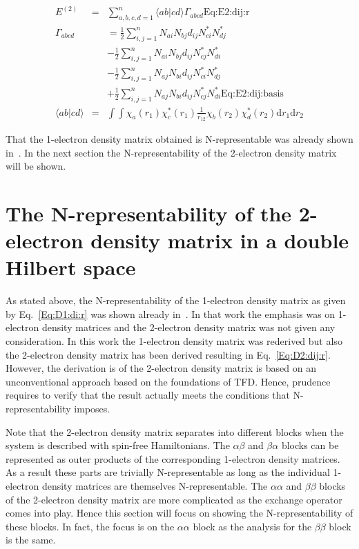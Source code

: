 \documentclass[pra,nofootinbib]{revtex4-1}
\newcommand{\dlabel}[1]{\text{#1}\label{#1}}
\begin{document}
\begin{eqnarray}
  E^{(2)}
  &=& \sum_{a,b,c,d=1}^{n} \langle a b | c d \rangle \Gamma_{abcd} \dlabel{Eq:E2:dij:r} \\
  \Gamma_{abcd}
  &&= \frac{1}{2}\sum_{i,j=1}^{n} N_{ai}N_{bj} d_{ij} N_{ci}^*N_{dj}^* \nonumber \\
  &&- \frac{1}{2}\sum_{i,j=1}^{n} N_{ai}N_{bj} d_{ij} N_{cj}^*N_{di}^* \nonumber \\
  &&- \frac{1}{2}\sum_{i,j=1}^{n} N_{aj}N_{bi} d_{ij} N_{ci}^*N_{dj}^* \nonumber \\
  &&+ \frac{1}{2}\sum_{i,j=1}^{n} N_{aj}N_{bi} d_{ij} N_{cj}^*N_{di}^* \dlabel{Eq:E2:dij:basis} \\
  \langle a b | c d \rangle
  &=& \int\int \chi_a(r_1) \chi^*_c(r_1) \frac{1}{r_{12}} \chi_b(r_2) \chi^*_d(r_2) 
      \mathrm{d}r_1 \mathrm{d}r_2
\end{eqnarray}

That the 1-electron density matrix obtained is N-representable was already shown in~\cite{van_Dam_2016}.
In the next section the N-representability of the 2-electron density matrix will be shown.

\section{The N-representability of the 2-electron density matrix in a double Hilbert space}

As stated above, the N-representability of the 1-electron density matrix as given by
Eq.~\ref{Eq:D1:di:r} was shown already in~\cite{van_Dam_2016}. In that work the emphasis 
was on 1-electron density matrices and the 2-electron density matrix was not given any
consideration. In this work the 1-electron density matrix was rederived but also the
2-electron density matrix has been derived resulting in Eq.~\ref{Eq:D2:dij:r}. However,
the derivation is of the 2-electron density matrix is based on an unconventional approach
based on the foundations of TFD. Hence, prudence requires to verify that the result actually
meets the conditions that N-representability imposes. 

Note that the 2-electron density matrix separates into different blocks when the system
is described with spin-free Hamiltonians. The $\alpha\beta$ and $\beta\alpha$ blocks 
can be represented as outer products of the corresponding 1-electron density matrices. As a
result these parts are trivially N-representable as long as the individual 1-electron
density matrices are themselves N-representable. The $\alpha\alpha$ and $\beta\beta$ blocks of 
the 2-electron density matrix are more complicated as the exchange operator comes into
play. Hence this section will focus on showing the N-representability of these blocks.
In fact, the focus is on the $\alpha\alpha$ block as the analysis for the $\beta\beta$ 
block is the same. 
\end{document}
